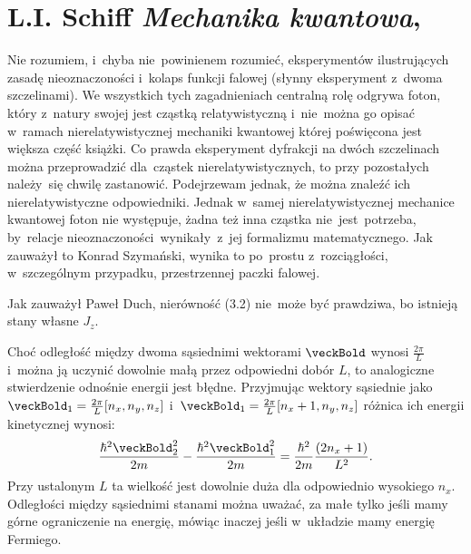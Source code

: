 \documentclass[a4paper,11pt]{article}
\numberwithin{equation}{section}
\begin{document}
\section{L.I. Schiff \textit{Mechanika kwantowa},
  \parencite{SchiffMechanikaKwantowe1987}}


\vspace{0em}



\vspace{0em}


\noindent
Nie rozumiem, i~chyba nie~powinienem rozumieć, eksperymentów
ilustrujących zasadę nieoznaczoności i~kolaps funkcji falowej
(słynny eksperyment z~dwoma szczelinami). We wszystkich tych
zagadnieniach centralną rolę odgrywa foton, który z~natury swojej
jest cząstką relatywistyczną i~nie~można go opisać w~ramach
nierelatywistycznej mechaniki kwantowej której poświęcona jest
większa część książki. Co prawda eksperyment dyfrakcji na dwóch
szczelinach można przeprowadzić dla~cząstek nierelatywistycznych, to
przy pozostałych należy~się chwilę zastanowić. Podejrzewam jednak,
że można znaleźć ich nierelatywistyczne odpowiedniki. Jednak w~samej
nierelatywistycznej mechanice kwantowej foton nie występuje, żadna
też inna cząstka nie~jest~potrzeba, by~relacje
nieoznaczoności~wynikały~z~jej formalizmu matematycznego. Jak
zauważył to Konrad Szymański, wynika to po~prostu z~rozciągłości,
w~szczególnym przypadku, przestrzennej paczki falowej.

\VerSpaceFour



\noindent
{} Jak zauważył Paweł Duch, nierówność (3.2)
nie~może być prawdziwa, bo istnieją stany własne $J_{ z }$.

\VerSpaceFour



\noindent
{} Choć odległość między dwoma sąsiednimi
wektorami $\veckBold$ wynosi $\frac{ 2 \pi }{ L }$ i~można ją
uczynić dowolnie małą przez odpowiedni dobór $L$, to analogiczne
stwierdzenie odnośnie energii jest błędne. Przyjmując wektory
sąsiednie jako
$\veckBold_{ 1 } = \frac{ 2 \pi }{ L } [ n_{ x }, n_{ y }, n_{ z } ]$
i~$\veckBold_{ 1 } = \frac{ 2 \pi }{ L } [ n_{ x } + 1, n_{ y }, n_{ z } ]$
różnica ich energii kinetycznej wynosi:
\begin{equation}
  \label{eq:Schiff-01}
  \frac{ \hbar^{ 2 } \veckBold_{ 2 }^{ 2 } }{ 2 m }
  - \frac{ \hbar^{ 2 } \veckBold_{ 1 }^{ 2 } }{ 2 m }
  = \frac{ \hbar^{ 2 } }{ 2 m } \frac{ ( 2 n_{ x } + 1 ) }{ L^{ 2 } }.
\end{equation}
Przy ustalonym $L$ ta wielkość jest dowolnie duża dla odpowiednio
wysokiego $n_{ x }$. Odległości między sąsiednimi stanami można
uważać, za małe tylko jeśli mamy górne ograniczenie na energię,
mówiąc inaczej jeśli w~układzie mamy energię Fermiego.
\end{document}
